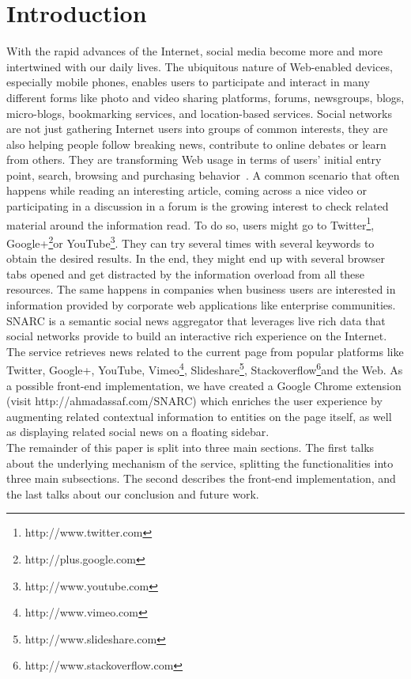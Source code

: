 \documentclass[oribibl]{llncs}
\begin{document}
\section{Introduction}
With the rapid advances of the Internet, social media become more and more intertwined with our daily lives. The ubiquitous nature of Web-enabled devices, especially mobile phones, enables users to participate and interact in many different forms like photo and video sharing platforms, forums, newsgroups, blogs, micro-blogs, bookmarking services, and location-based services. Social networks are not just gathering Internet users into groups of common interests, they are also helping people follow breaking news, contribute to online debates or learn from others. They are transforming Web usage in terms of users' initial entry point, search, browsing and purchasing behavior~\cite{Bakshy2012}.
A common scenario that often happens while reading an interesting article, coming across a nice video or participating in a discussion in a forum is the growing interest to check related material around the information read. To do so, users might go to Twitter\footnote{http://www.twitter.com}, Google+\footnote{http://plus.google.com}or YouTube\footnote{http://www.youtube.com}. They can try several times with several keywords to obtain the desired results. In the end, they might end up with several browser tabs opened and get distracted by the information overload from all these resources. The same happens in companies when business users are interested in information provided by corporate web applications like enterprise communities. SNARC is a semantic social news aggregator that leverages live rich data that social networks provide to build an interactive rich experience on the Internet. The service retrieves news related to the current page from popular platforms like Twitter, Google+, YouTube, Vimeo\footnote{http://www.vimeo.com}, Slideshare\footnote{http://www.slideshare.com}, Stackoverflow\footnote{http://www.stackoverflow.com}and the Web. As a possible front-end implementation, we have created a Google Chrome extension (visit http://ahmadassaf.com/SNARC) which enriches the user experience by augmenting related contextual information to entities on the page itself, as well as displaying related social news on a floating sidebar.
\\The remainder of this paper is split into three main sections. The first talks about the underlying mechanism of the service, splitting the functionalities into three main subsections. The second describes the front-end implementation, and the last talks about our conclusion and future work.
\end{document}
